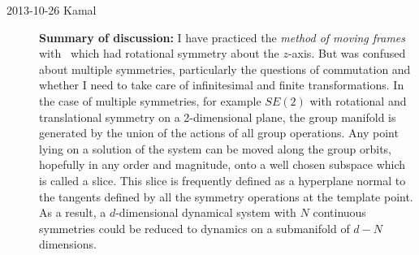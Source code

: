 \begin{description}
\item[2013-10-26 Kamal] \textbf{Summary of discussion:} I have practiced the
\emph{method of moving frames} with \cLf\ which had rotational symmetry about
the $z$-axis. But was confused about multiple symmetries, particularly the questions
of commutation and whether I need to take care of infinitesimal and finite transformations.
In the case of multiple
symmetries, for example $SE(2)$ with
rotational and translational symmetry on a 2-dimensional plane, the group manifold
is generated by the union of the actions of all group operations. Any point
lying on a solution of the system can be moved along the group orbits, hopefully
in any order and magnitude, onto a well chosen subspace which is called a slice.
This slice is frequently defined as a hyperplane normal to the tangents defined by
all the symmetry operations at the template point. As a result, a $d$-dimensional
dynamical system with $N$ continuous symmetries could be reduced to dynamics on a submanifold
of $d-N$ dimensions.


\end{description}
